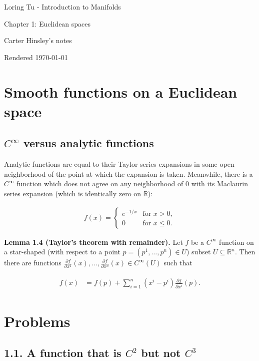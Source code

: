 \documentclass[a4paper]{article}
\newcommand{\R}{\mathbb{R}}
\begin{document}
\begin{center}
\LARGE{Loring Tu - Introduction to Manifolds}

\Large{Chapter 1: Euclidean spaces}

\large{Carter Hinsley's notes}

Rendered \today
\end{center}

\section{Smooth functions on a Euclidean space}

\subsection{$C^\infty$ versus analytic functions}

Analytic functions are equal to their Taylor series expansions in some open neighborhood of the point at which the expansion is taken. Meanwhile, there is a $C^\infty$ function which does not agree on any neighborhood of $0$ with its Maclaurin series expansion (which is identically zero on $\R$):

\begin{align}
    f(x) = \left\{\begin{matrix} e^{-1/x} & \text{for } x > 0, \\ 0 & \text{for } x \leq 0. \end{matrix}\right.
\end{align}

\textbf{Lemma 1.4 (Taylor's theorem with remainder).} Let $f$ be a $C^\infty$ function on a star-shaped (with respect to a point $p = (p^1, \ldots, p^n) \in U$) subset $U \subseteq \R^n$. Then there are functions $\frac{\partial f}{\partial x^1}(x), \ldots, \frac{\partial f}{\partial x^n}(x) \in C^\infty(U)$ such that

\begin{align}
\begin{split}
    f(x) &= f(p) + \sum_{i=1}^n (x^i - p^i)\frac{\partial f}{\partial x^i}(p).
\end{split}
\end{align}

\section*{Problems}

\subsection*{1.1. A function that is $C^2$ but not $C^3$}
\end{document}
